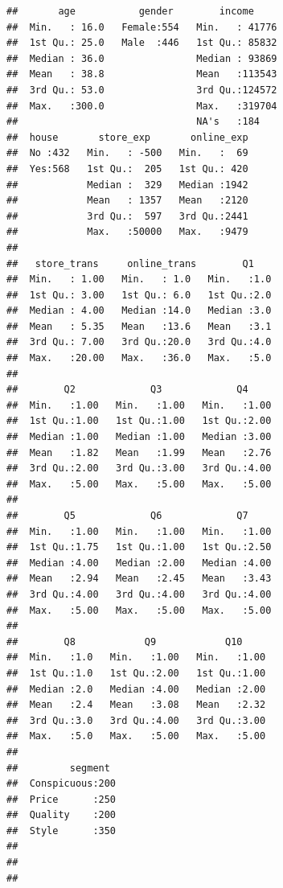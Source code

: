 \documentclass[12pt,]{krantz}
\theoremstyle{definition}
\theoremstyle{definition}
\theoremstyle{definition}
\theoremstyle{remark}
\begin{document}
\begin{verbatim}
##       age           gender        income      
##  Min.   : 16.0   Female:554   Min.   : 41776  
##  1st Qu.: 25.0   Male  :446   1st Qu.: 85832  
##  Median : 36.0                Median : 93869  
##  Mean   : 38.8                Mean   :113543  
##  3rd Qu.: 53.0                3rd Qu.:124572  
##  Max.   :300.0                Max.   :319704  
##                               NA's   :184     
##  house       store_exp       online_exp  
##  No :432   Min.   : -500   Min.   :  69  
##  Yes:568   1st Qu.:  205   1st Qu.: 420  
##            Median :  329   Median :1942  
##            Mean   : 1357   Mean   :2120  
##            3rd Qu.:  597   3rd Qu.:2441  
##            Max.   :50000   Max.   :9479  
##                                          
##   store_trans     online_trans        Q1     
##  Min.   : 1.00   Min.   : 1.0   Min.   :1.0  
##  1st Qu.: 3.00   1st Qu.: 6.0   1st Qu.:2.0  
##  Median : 4.00   Median :14.0   Median :3.0  
##  Mean   : 5.35   Mean   :13.6   Mean   :3.1  
##  3rd Qu.: 7.00   3rd Qu.:20.0   3rd Qu.:4.0  
##  Max.   :20.00   Max.   :36.0   Max.   :5.0  
##                                              
##        Q2             Q3             Q4      
##  Min.   :1.00   Min.   :1.00   Min.   :1.00  
##  1st Qu.:1.00   1st Qu.:1.00   1st Qu.:2.00  
##  Median :1.00   Median :1.00   Median :3.00  
##  Mean   :1.82   Mean   :1.99   Mean   :2.76  
##  3rd Qu.:2.00   3rd Qu.:3.00   3rd Qu.:4.00  
##  Max.   :5.00   Max.   :5.00   Max.   :5.00  
##                                              
##        Q5             Q6             Q7      
##  Min.   :1.00   Min.   :1.00   Min.   :1.00  
##  1st Qu.:1.75   1st Qu.:1.00   1st Qu.:2.50  
##  Median :4.00   Median :2.00   Median :4.00  
##  Mean   :2.94   Mean   :2.45   Mean   :3.43  
##  3rd Qu.:4.00   3rd Qu.:4.00   3rd Qu.:4.00  
##  Max.   :5.00   Max.   :5.00   Max.   :5.00  
##                                              
##        Q8            Q9            Q10      
##  Min.   :1.0   Min.   :1.00   Min.   :1.00  
##  1st Qu.:1.0   1st Qu.:2.00   1st Qu.:1.00  
##  Median :2.0   Median :4.00   Median :2.00  
##  Mean   :2.4   Mean   :3.08   Mean   :2.32  
##  3rd Qu.:3.0   3rd Qu.:4.00   3rd Qu.:3.00  
##  Max.   :5.0   Max.   :5.00   Max.   :5.00  
##                                             
##         segment   
##  Conspicuous:200  
##  Price      :250  
##  Quality    :200  
##  Style      :350  
##                   
##                   
## 
\end{verbatim}
\end{document}
